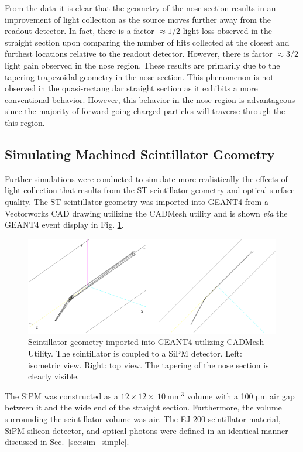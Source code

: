 From the data it is clear that the geometry of the nose section results in an improvement of light collection as the source moves further away from the readout detector.  In fact, there is a factor $\approx 1/2$ light loss observed in the straight section upon comparing the number of hits collected at the closest and furthest locations relative to the readout detector.  However, there is factor $\approx 3/2$ light gain observed in the nose region.  These results are primarily due to the tapering trapezoidal geometry in the nose section.  This phenomenon is not observed in the quasi-rectangular straight section as it exhibits a more conventional behavior. However, this behavior in the nose region is advantageous since the majority of forward going charged particles will traverse through the this region.

\subsection{Simulating Machined Scintillator Geometry} \label{sec:sim_mach}

Further simulations were conducted to simulate more realistically the effects of light collection that results from the ST scintillator geometry and optical surface quality.  The ST scintillator geometry was imported into GEANT4 from a Vectorworks CAD drawing utilizing the CADMesh utility \cite{cadmesh_g4} and is shown \textit{via} the GEANT4 event display in Fig. \ref{fig:pk_cadmesh}.
	\begin{figure}[!htb]
	\centering
	\includegraphics[width=1.0\columnwidth]{simulation/figs/pk_cadmesh}
	\caption{Scintillator geometry imported into GEANT4 utilizing CADMesh Utility.  The scintillator is  coupled to a SiPM detector.  Left: isometric view.  Right: top view.  The tapering of the nose section is clearly visible.}
	\label{fig:pk_cadmesh}
	\end{figure}
The SiPM was constructed as a $12 \times 12 \times\ 10\ \mathrm{mm^{3}}$ volume with a 100 $\mathrm{\mu m}$ air gap between it and the wide end of the straight section.  Furthermore, the volume surrounding the scintillator volume was air.  The EJ-200 scintillator material, SiPM silicon detector, and optical photons were defined in an identical manner discussed in Sec.~\ref{sec:sim_simple}.


